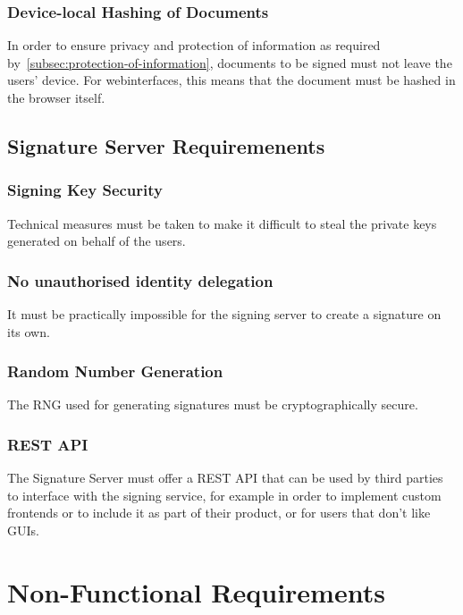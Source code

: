 \subsection{Device-local Hashing of Documents}\label{subsec:local-hashing-of-documents}
In order to ensure privacy and protection of information as required by~\ref{subsec:protection-of-information},
documents to be signed must not leave the users' device.
For webinterfaces, this means that the document must be hashed in the browser itself.

\section{Signature Server Requiremenents}
\label{sec:signatureserverrequirements}
\subsection{Signing Key Security}\label{subsec:signing-key-security}
Technical measures must be taken to make it difficult to steal the private keys generated on behalf of the users.

\subsection{No unauthorised identity delegation}\label{subsec:no-unauthorised-identity-delegation}
It must be practically impossible for the signing server to create a signature on its own.

\subsection{Random Number Generation}\label{subsec:random-number-generation}
The \gls{RNG} used for generating signatures must be cryptographically secure.

\subsection{REST API}\label{subsec:rest-api}
The Signature Server must offer a \gls{REST} \gls{API} that can be used by third parties to interface with the signing service,
for example in order to implement custom frontends or to include it as part of their product,
or for users that don't like \gls{GUI}s.

\chapter{Non-Functional Requirements}
\label{ch:nonfunctionalrequirements}

